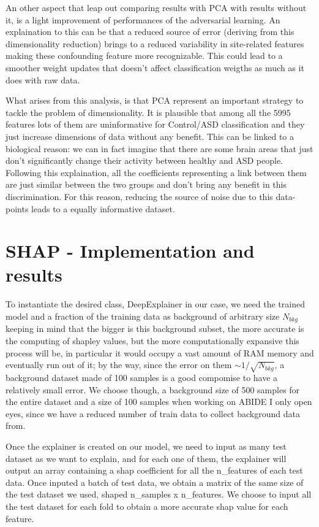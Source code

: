 \documentclass[11pt]{report}
\begin{document}
An other aspect that leap out comparing results with PCA with results without it, is a light improvement of performances of the adversarial learning.
An explaination to this can be that a reduced source of error (deriving from this dimensionality reduction) brings to a reduced variability in site-related features making these confounding feature more recognizable. This could lead to a smoother weight updates that doesn't affect classification weigths as much as it does with raw data.

What arises from this analysis, is that PCA represent an important strategy to tackle the problem of dimensionality. It is plausible tbat among all the 5995 features lots of them are uninformative for Control/ASD classification and they just increase dimensions of data without any benefit. This can be linked to a biological reason: we can in fact imagine that there are some brain areas that just don't significantly change their activity between healthy and ASD people. Following this explaination, all the coefficients representing a link between them are just similar between the two groups and don't bring any benefit in this discrimination. For this reason, reducing the source of noise due to this data-points leads to a equally informative dataset.

\newpage


\chapter{SHAP - Implementation and results}


To instantiate the desired class, DeepExplainer in our case, we need the trained model and a fraction of the training data as background of arbitrary size $N_{bkg}$ keeping in mind that the bigger is this background subset, the more accurate is the computing of shapley values, but the more computationally expansive this process will be, in particular it would occupy a vast amount of RAM memory and eventually run out of it; by the way, since the error on them $\sim 1/\sqrt{N_{bkg}}$, a background dataset made of 100 samples is a good compomise to have a relatively small error.
We choose though, a background size of 500 samples for the entire dataset and a size of 100 samples when working on ABIDE I only open eyes, since we have a reduced number of train data to collect background data from.

Once the explainer is created on our model, we need to input as many test dataset as we want to explain, and for each one of them, the explainer will output an array containing a shap coefficient for all the n\_features of each test data.
Once inputed a batch of test data, we obtain a matrix of the same size of the test dataset we used, shaped n\_samples x n\_features.
We choose to input all the test dataset for each fold to obtain a more accurate shap value for each feature.
\end{document}
